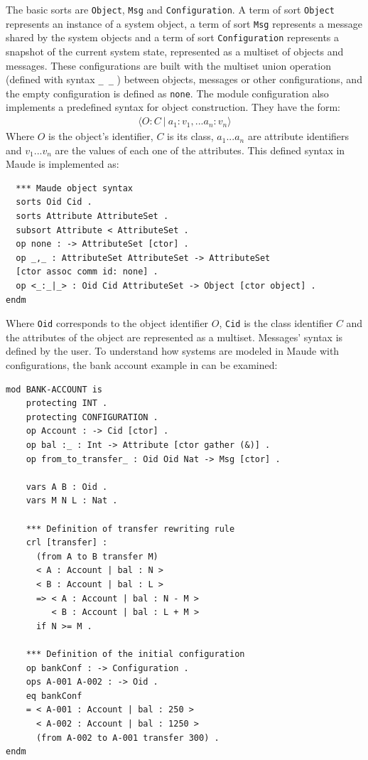 The basic sorts are \texttt{Object}, \texttt{Msg} and \texttt{Configuration}. A term of sort \texttt{Object} represents an instance of a system object, a term of sort \texttt{Msg} represents a message shared by the system objects and a term of sort \texttt{Configuration} represents a snapshot of the current system state, represented as a multiset of objects and messages. These configurations are built with the multiset union operation (defined with syntax \texttt{\_\,\_} ) between objects, messages or other configurations, and the empty configuration is defined as \texttt{none}. The module configuration also implements a predefined syntax for object construction. They have the form:
\begin{align*}
    \langle O : C \ | \ a_1:v_1,...a_n:v_n \rangle
\end{align*}
Where $O$ is the object's identifier, $C$ is its class, $a_1...a_n$ are attribute identifiers and $v_1...v_n$ are the values of each one of the attributes. This defined syntax in Maude is implemented as:
\begin{lstlisting}
  *** Maude object syntax
  sorts Oid Cid .
  sorts Attribute AttributeSet .
  subsort Attribute < AttributeSet .
  op none : -> AttributeSet [ctor] .
  op _,_ : AttributeSet AttributeSet -> AttributeSet
  [ctor assoc comm id: none] .
  op <_:_|_> : Oid Cid AttributeSet -> Object [ctor object] .
endm
\end{lstlisting}
Where \texttt{Oid} corresponds to the object identifier $O$, \texttt{Cid} is the class identifier $C$ and the attributes of the object are represented as a multiset. Messages' syntax is defined by the user. To understand how systems are modeled in Maude with configurations, the bank account example in \cite{MaudeManual} can be examined:
\begin{lstlisting}
mod BANK-ACCOUNT is
    protecting INT .
    protecting CONFIGURATION .
    op Account : -> Cid [ctor] .
    op bal :_ : Int -> Attribute [ctor gather (&)] .
    op from_to_transfer_ : Oid Oid Nat -> Msg [ctor] .
    
    vars A B : Oid .
    vars M N L : Nat .

    *** Definition of transfer rewriting rule
    crl [transfer] :
      (from A to B transfer M)
      < A : Account | bal : N >
      < B : Account | bal : L >
      => < A : Account | bal : N - M >
         < B : Account | bal : L + M >
      if N >= M .

    *** Definition of the initial configuration
    op bankConf : -> Configuration .
    ops A-001 A-002 : -> Oid .
    eq bankConf
    = < A-001 : Account | bal : 250 >
      < A-002 : Account | bal : 1250 >
      (from A-002 to A-001 transfer 300) .
endm
\end{lstlisting}
